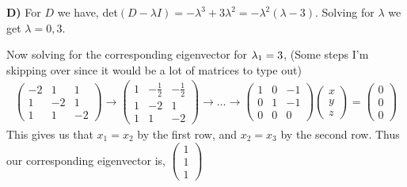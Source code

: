 \documentclass[12pt]{article}
\begin{document}
    \textbf{D)} For $D$ we have, det$(D - \lambda I) = -\lambda^3 + 3\lambda^2 = -\lambda^2(\lambda - 3)$. Solving for $\lambda$ we get $\lambda = 0,3$.

    Now solving for the corresponding eigenvector for ${\lambda}_1 = 3$, (Some steps I'm skipping over since it would be a lot of matrices to type out)
    \begin{align*}
        \begin{pmatrix}
            -2 & 1 & 1 \\
            1 & -2 & 1 \\
            1 & 1 & -2
        \end{pmatrix} \rightarrow \begin{pmatrix}
            1 & -\frac{1}{2} & -\frac{1}{2} \\
            1 & -2 & 1 \\ 
            1 & 1 & -2
        \end{pmatrix} \rightarrow \dots \rightarrow \begin{pmatrix}
            1 & 0 & -1 \\ 0 & 1 & -1 \\ 0 & 0 & 0
        \end{pmatrix}\begin{pmatrix}
            x \\ y \\ z
        \end{pmatrix} = \begin{pmatrix}
            0 \\ 0 \\ 0
        \end{pmatrix}
    \end{align*}
    This gives us that $x_1 = x_2$ by the first row, and $x_2 = x_3$ by the second row. Thus our corresponding eigenvector is, $\begin{pmatrix}
        1 \\ 1 \\ 1
    \end{pmatrix}$
\end{document}
